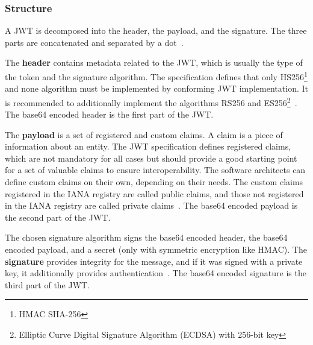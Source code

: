 \subsubsection{Structure}
A JWT is decomposed into the header, the payload, and the signature.
The three parts are concatenated and separated by a dot~\cite{jwtdocauth0}.

The \textbf{header} contains metadata related to the JWT, which is usually the type of the token and the signature algorithm.
The specification defines that only HS256\footnote{HMAC SHA-256} and none algorithm must be implemented by conforming JWT implementation.
It is recommended to additionally implement the algorithms RS256 and ES256\footnote{Elliptic Curve Digital Signature Algorithm (ECDSA) with 256-bit key}~\cite{jwtdocauth0, jwtrfc}.
The base64 encoded header is the first part of the JWT.

The \textbf{payload} is a set of registered and custom claims.
A claim is a piece of information about an entity.
The JWT specification defines registered claims, which are not mandatory for all cases but should provide a good starting point for a set of valuable claims to ensure interoperability.
The software architects can define custom claims on their own, depending on their needs.
The custom claims registered in the IANA registry are called public claims, and those not registered in the IANA registry are called private claims~\cite{jwtdocauth0, jwtrfc}.
The base64 encoded payload is the second part of the JWT.

The chosen signature algorithm signs the base64 encoded header, the base64 encoded payload, and a secret (only with symmetric encryption like HMAC).
The \textbf{signature} provides integrity for the message, and if it was signed with a private key, it additionally provides authentication~\cite{jwtdocauth0}.
The base64 encoded signature is the third part of the JWT.

